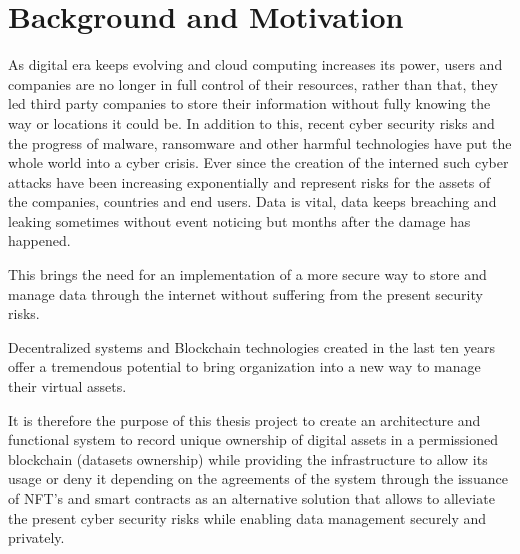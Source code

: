 \section{Background and Motivation}
\label{ch:intro:sec:motivation}
As digital era keeps evolving and cloud computing increases its power, users and companies are no longer in full control of their resources, rather than that, they led third party companies to store their information without fully knowing the way or locations it could be. In addition to this, recent cyber security risks and the progress of malware, ransomware and other harmful technologies have put the whole world into a cyber crisis. Ever since the creation of the interned such cyber attacks have been increasing exponentially and represent risks for the assets of the companies, countries and end users. Data is vital, data keeps breaching and leaking sometimes without event noticing but months after the damage has happened. 

This brings the need for an implementation of a more secure way to store and manage data through the internet without suffering from the present security risks.

Decentralized systems and Blockchain technologies created in the last ten years offer a tremendous potential to bring organization into a new way to manage their virtual assets. 

It is therefore the purpose of this thesis project to create an architecture and functional system to record unique ownership of digital assets in a permissioned blockchain (datasets ownership) while providing the infrastructure to allow its usage or deny it depending on the agreements of the system through the issuance of NFT's and smart contracts as an alternative solution that allows to alleviate the present cyber security risks while enabling data management securely and privately.